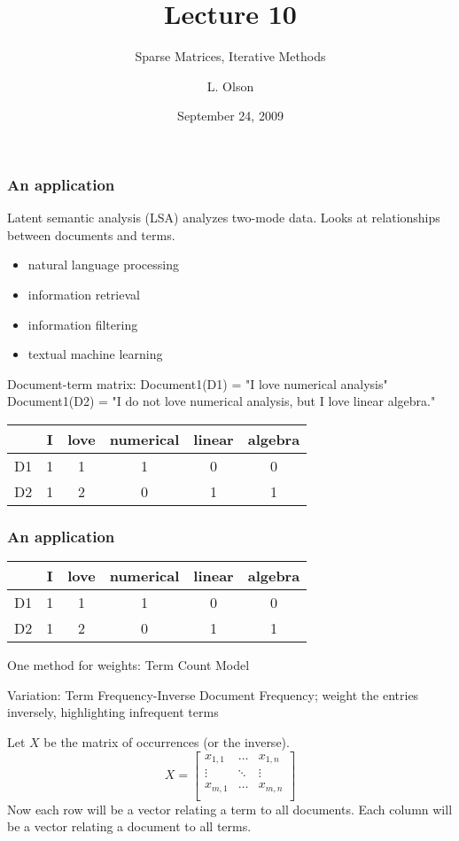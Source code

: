\documentclass[10pt]{beamer}
\author{L. Olson}
\institute[UIUC]
{Department of Computer Science\\
University of Illinois at Urbana-Champaign\\
\vspace{0.5cm}
}
\title[CS 357]{Lecture 10}
\subtitle{Sparse Matrices, Iterative Methods}
\date{September 24, 2009}
\begin{document}
\begin{frame}
  \titlepage
\end{frame}
\begin{frame}
\frametitle{An application}
Latent semantic analysis (LSA) analyzes two-mode data.  Looks at relationships
between documents and terms.
\begin{itemize}
    \item natural language processing
    \item information retrieval
    \item information filtering
    \item textual machine learning
\end{itemize}

Document-term matrix:
Document1(D1) = "I love numerical analysis"
Document1(D2) = "I do not love numerical analysis, but I love linear algebra."

\begin{center}
\begin{tabular}{|c|c|c|c|c|c|}\hline
   & I & love & numerical & linear & algebra\\\hline
D1 & 1 & 1    & 1         & 0      & 0 \\\hline
D2 & 1 & 2    & 0         & 1      & 1 \\\hline
\end{tabular}
\end{center}
\end{frame}
\begin{frame}
\frametitle{An application}
\begin{center}
\begin{tabular}{|c|c|c|c|c|c|}\hline
   & I & love & numerical & linear & algebra\\\hline
D1 & 1 & 1    & 1         & 0      & 0 \\\hline
D2 & 1 & 2    & 0         & 1      & 1 \\\hline
\end{tabular}
\end{center}
\bigskip

One method for weights: Term Count Model

Variation: Term Frequency-Inverse Document Frequency; weight the entries inversely, highlighting infrequent terms
\bigskip

Let $X$ be the matrix of occurrences (or the inverse).
\begin{equation*}
X=
    \begin{bmatrix}
    x_{1,1} & \dots & x_{1,n}\\
    \vdots & \ddots & \vdots\\
    x_{m,1} & \dots & x_{m,n}\\
    \end{bmatrix}
\end{equation*}
Now each row will be a vector relating a term to all documents.  Each column
will be a vector relating a document to all terms.
\end{frame}
\end{document}
